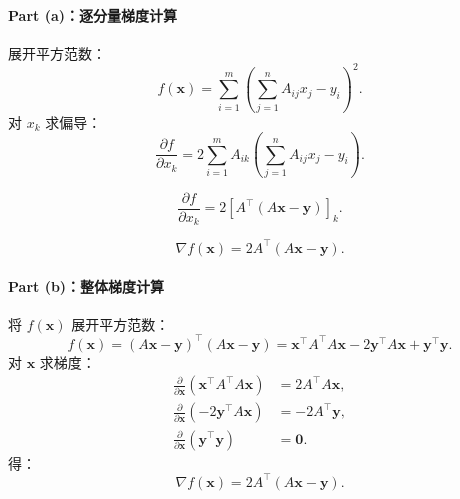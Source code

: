 \paragraph{Part (a)：逐分量梯度计算}  
展开平方范数：
\[
f(\bm{x}) = \sum_{i=1}^m \left( \sum_{j=1}^n A_{ij}x_j - y_i \right)^2.
\]
对 \( x_k \) 求偏导：
\[
\frac{\partial f}{\partial x_k} = 2 \sum_{i=1}^m A_{ik} \left( \sum_{j=1}^n A_{ij}x_j - y_i \right).
\]

\[
\frac{\partial f}{\partial x_k} = 2 \left[ A^\top (A\bm{x} - \bm{y}) \right]_k.
\]

\[
\boxed{\nabla f(\bm{x}) = 2A^\top (A\bm{x} - \bm{y})}.
\]

\paragraph{Part (b)：整体梯度计算}  
将 \( f(\bm{x}) \) 展开平方范数：
\[
f(\bm{x}) = (A\bm{x} - \bm{y})^\top (A\bm{x} - \bm{y}) = \bm{x}^\top A^\top A\bm{x} - 2\bm{y}^\top A\bm{x} + \bm{y}^\top \bm{y}.
\]
对 \( \bm{x} \) 求梯度：
\begin{align*}
\frac{\partial}{\partial \bm{x}} (\bm{x}^\top A^\top A\bm{x}) &= 2A^\top A\bm{x}, \\
\frac{\partial}{\partial \bm{x}} (-2\bm{y}^\top A\bm{x}) &= -2A^\top \bm{y}, \\
\frac{\partial}{\partial \bm{x}} (\bm{y}^\top \bm{y}) &= \bm{0}.
\end{align*}
得：
\[
\boxed{\nabla f(\bm{x}) = 2A^\top (A\bm{x} - \bm{y})}.
\]